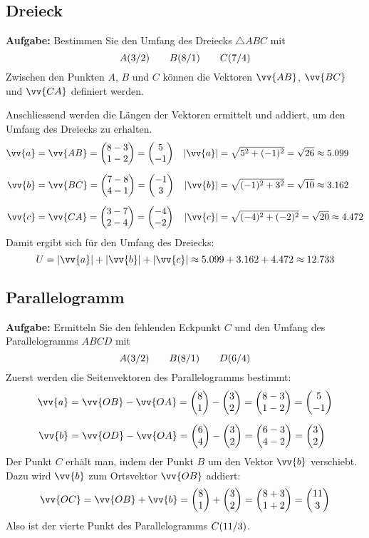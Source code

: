 \subsection{Dreieck}
\textbf{Aufgabe:} Bestimmen Sie den Umfang des Dreiecks $\triangle ABC$ mit
\[
  \pxy[A]{3,2} \qquad \pxy[B]{8,1} \qquad \pxy[C]{7,4}
\]
Zwischen den Punkten $A$, $B$ und $C$ können die Vektoren $\vv{AB}$, $\vv{BC}$ und $\vv{CA}$ definiert werden.
\begin{center}
\end{center}
Anschliessend werden die Längen der Vektoren ermittelt und addiert, um den Umfang des Dreiecks zu erhalten.
\begin{align*}
  \vv{a} &= \vv{AB} = \vxy{8-3,1-2} = \vxy{5,-1} & |\vv{a}| &= \sqrt{5^{2}+(-1)^{2}} = \sqrt{26} \approx 5.099 \\[2mm]
  \vv{b} &= \vv{BC} = \vxy{7-8,4-1} = \vxy{-1,3} & |\vv{b}| &= \sqrt{(-1)^{2}+3^{2}} = \sqrt{10} \approx 3.162 \\[2mm]
  \vv{c} &= \vv{CA} = \vxy{3-7,2-4} = \vxy{-4,-2} & |\vv{c}| &= \sqrt{(-4)^{2}+(-2)^{2}} = \sqrt{20} \approx 4.472
\end{align*}
Damit ergibt sich für den Umfang des Dreiecks:
\[
  U = |\vv{a}|+|\vv{b}|+|\vv{c}| \approx 5.099 + 3.162 + 4.472 \approx 12.733
\]

\newpage
\subsection{Parallelogramm}

\textbf{Aufgabe:} Ermitteln Sie den fehlenden Eckpunkt $C$ und den Umfang des Parallelogramms $ABCD$ mit
\[
  \pxy[A]{3,2} \qquad \pxy[B]{8,1} \qquad \pxy[D]{6,4}
\]
Zuerst werden die Seitenvektoren des Parallelogramms bestimmt:
\begin{align*}
  \vv{a} &= \vv{OB}-\vv{OA} = \vxy{8,1}-\vxy{3,2} = \vxy{8-3,1-2} = \vxy{5,-1} \\[2mm]
  \vv{b} &= \vv{OD}-\vv{OA} = \vxy{6,4}-\vxy{3,2} = \vxy{6-3,4-2} = \vxy{3,2}
\end{align*}
Der Punkt $C$ erhält man, indem der Punkt $B$ um den Vektor $\vv{b}$ verschiebt. Dazu wird $\vv{b}$ zum Ortsvektor $\vv{OB}$ addiert:
\[
  \vv{OC} = \vv{OB} + \vv{b} = \vxy{8,1} + \vxy{3,2} = \vxy{8+3,1+2} = \vxy{11,3}
\]
Also ist der vierte Punkt des Parallelogramms $\pxy[C]{11,3}$.


